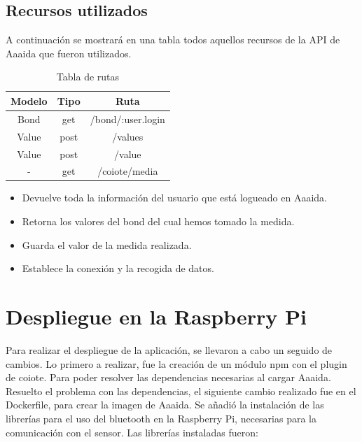 \subsection{Recursos utilizados}

A continuación se mostrará en una tabla todos aquellos recursos de la API de Aaaida que fueron utilizados. 


\begin{table}[htb]

\begin{center}

\begin{tabular}{|c|c|c|}

\hline

{\bf Modelo} & {\bf Tipo} &

{\bf Ruta} \\ \hline \hline

Bond & get & /bond/:user.login  \\ \hline

Value & post & /values \\ \hline

Value & post & /value \\ \hline

- & get & /coiote/media \\ \hline

\end{tabular}

\caption{Tabla de rutas}

\label{T:prova}

\end{center}

\end{table}

\begin{itemize}
\item Devuelve toda la información del usuario que está logueado en Aaaida.
\item Retorna los valores del bond del cual hemos tomado la medida.
\item Guarda el valor de la medida realizada. 
\item Establece la conexión y la recogida de datos.
\end{itemize}

\section{Despliegue en la Raspberry Pi}

Para realizar el despliegue de la aplicación, se llevaron a cabo un seguido de cambios. 
Lo primero a realizar, fue la creación de un módulo npm con el plugin de coiote. Para poder resolver las dependencias necesarias al cargar Aaaida.
Resuelto el problema con las dependencias, el siguiente cambio realizado fue en el Dockerfile, para crear la imagen de Aaaida. Se añadió la instalación de las librerías para el uso del bluetooth en la Raspberry Pi, necesarias para la comunicación con el sensor. 
Las librerías instaladas fueron:
 

